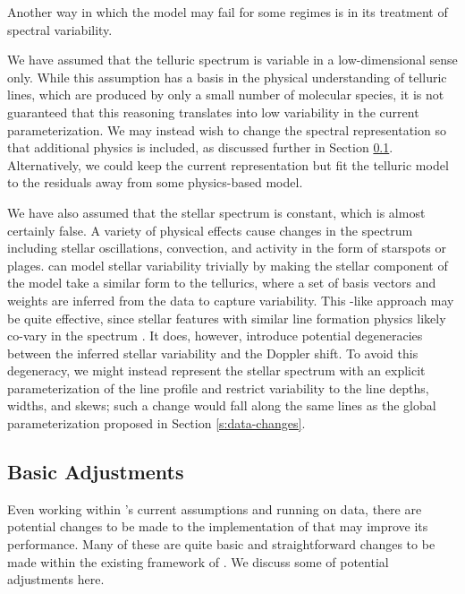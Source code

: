 \documentclass[modern]{aastex62}
\begin{document}
{Another way in which the \wobble model may fail for some regimes is in its treatment of spectral variability.

We have assumed that the telluric spectrum is variable in a low-dimensional sense only. 
While this assumption has a basis in the physical understanding of telluric lines, which are produced by only a small number of molecular species, it is not guaranteed that this reasoning translates into low variability in the current parameterization. 
We may instead wish to change the spectral representation so that additional physics is included, as discussed further in Section \ref{s:improvements}. 
Alternatively, we could keep the current representation but fit the telluric model to the residuals away from some physics-based model. 

We have also assumed that the stellar spectrum is constant, which is almost certainly false. 
A variety of physical effects cause changes in the spectrum including stellar oscillations, convection, and activity in the form of starspots or plages. 
\wobble can model stellar variability trivially by making the stellar component of the model take a similar form to the tellurics, where a set of basis vectors and weights are inferred from the data to capture variability. 
This \PCA-like approach may be quite effective, since stellar features with similar line formation physics likely co-vary in the spectrum \citep{Davis2017, Dumusque2018}. 
It does, however, introduce potential degeneracies between the inferred stellar variability and the Doppler shift. 
To avoid this degeneracy, we might instead represent the stellar spectrum with an explicit parameterization of the line profile and restrict variability to the line depths, widths, and skews; such a change would fall along the same lines as the global \LSF parameterization proposed in Section \ref{s:data-changes}.



\subsection{Basic Adjustments}
\label{s:improvements}

Even working within \wobble's current assumptions and running on \HARPS data, there are potential changes to be made to the implementation of \wobble that may improve its performance. 
Many of these are quite basic and straightforward changes to be made within the existing framework of \wobble. 
We discuss some of potential adjustments here.

}
\end{document}
